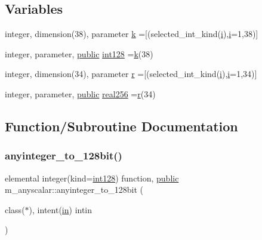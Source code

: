 \subsection*{Variables}
\begin{DoxyCompactItemize}
\item 
integer, dimension(38), parameter \hyperlink{namespacem__anyscalar_a099da1dd8639cdce3d0f5bb3cb8fbd03}{k} =\mbox{[}(selected\+\_\+int\+\_\+kind(\hyperlink{intro__blas1_83_8txt_a8ba82a50c0c2c12d5f6a77f7e4651c0b}{i}),\hyperlink{intro__blas1_83_8txt_a8ba82a50c0c2c12d5f6a77f7e4651c0b}{i}=1,38)\mbox{]}
\item 
integer, parameter, \hyperlink{M__stopwatch_83_8txt_a2f74811300c361e53b430611a7d1769f}{public} \hyperlink{namespacem__anyscalar_a53057899b7d17505b79d9b8f5e6092a2}{int128} =\hyperlink{namespacem__anyscalar_a099da1dd8639cdce3d0f5bb3cb8fbd03}{k}(38)
\item 
integer, dimension(34), parameter \hyperlink{namespacem__anyscalar_af515907c09cc2ac286a4523cc73f5f52}{r} =\mbox{[}(selected\+\_\+int\+\_\+kind(\hyperlink{intro__blas1_83_8txt_a8ba82a50c0c2c12d5f6a77f7e4651c0b}{i}),\hyperlink{intro__blas1_83_8txt_a8ba82a50c0c2c12d5f6a77f7e4651c0b}{i}=1,34)\mbox{]}
\item 
integer, parameter, \hyperlink{M__stopwatch_83_8txt_a2f74811300c361e53b430611a7d1769f}{public} \hyperlink{namespacem__anyscalar_a6d3ef2bc1698c91d737dbd8824a9eb0b}{real256} =\hyperlink{namespacem__anyscalar_af515907c09cc2ac286a4523cc73f5f52}{r}(34)
\end{DoxyCompactItemize}


\subsection{Function/\+Subroutine Documentation}
\mbox{\label{namespacem__anyscalar_a513beeccb5c821157cbd2eea8a1d9842}} 
\subsubsection{\texorpdfstring{anyinteger\+\_\+to\+\_\+128bit()}{anyinteger\_to\_128bit()}}
{\footnotesize\ttfamily elemental integer(kind=\hyperlink{namespacem__anyscalar_a53057899b7d17505b79d9b8f5e6092a2}{int128}) function, \hyperlink{M__stopwatch_83_8txt_a2f74811300c361e53b430611a7d1769f}{public} m\+\_\+anyscalar\+::anyinteger\+\_\+to\+\_\+128bit (\begin{DoxyParamCaption}\item[{class($\ast$), intent(\hyperlink{M__journal_83_8txt_afce72651d1eed785a2132bee863b2f38}{in})}]{intin }\end{DoxyParamCaption})}




